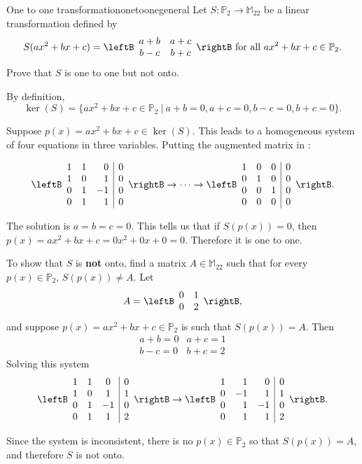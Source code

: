 \begin{example}{One to one transformation}{onetoonegeneral}
Let $S:\mathbb{P}_2\to\mathbb{M}_{22}$ be a linear transformation
defined by
\[ S(ax^2+bx+c)
=
\leftB\begin{array}{cc}
a+b & a+c \\ b-c & b+c \end{array}\rightB
\mbox{ for all }
 ax^2+bx+c\in \mathbb{P}_2.\]
Prove that $S$ is one to one but not onto.
\end{example}

\begin{solution}
By definition, 
\[ \ker(S)=\{ax^2+bx+c\in \mathbb{P}_2 ~|~ a+b=0,
a+c=0, b-c=0, b+c=0\}.\]

Suppose $p(x)=ax^2+bx+c\in\ker(S)$.
This leads to a homogeneous system of four equations in three 
variables.  
Putting the augmented matrix in {\rref}:

\[ \leftB\begin{array}{rrr|c}
1 & 1 & 0 & 0  \\
1 & 0 & 1 & 0  \\
0 & 1 & -1 & 0  \\
0 & 1 & 1 & 0  \end{array}\rightB
\rightarrow \cdots \rightarrow
\leftB\begin{array}{ccc|c}
1 & 0 & 0 & 0  \\
0 & 1 & 0 & 0  \\
0 & 0 & 1 & 0  \\
0 & 0 & 0 & 0  \end{array}\rightB. \]

The solution is $a=b=c=0$. This tells us that if $S(p(x)) = 0$, then $p(x) = ax^2+bx+c = 0x^2 + 0x + 0 = 0$. Therefore it is one to one. 

To show that $S$ is \textbf{not} onto, find a matrix $A\in\mathbb{M}_{22}$
such that for every $p(x)\in \mathbb{P}_2$, 
$S(p(x))\neq A$.
Let 
\[ A=\leftB\begin{array}{cc} 
0 & 1 \\ 0 & 2 \end{array}\rightB,\]
and suppose $p(x)=ax^2+bx+c\in \mathbb{P}_2$ is such that
$S(p(x))=A$.
Then
\[ \begin{array}{ll}
a+b=0 & a+c=1 \\ b-c=0 & b+c=2 \end{array}\]
Solving this system
\[ \leftB\begin{array}{ccc|c}
1 & 1 & 0 & 0  \\
1 & 0 & 1 & 1  \\
0 & 1 & -1 & 0  \\
0 & 1 & 1 & 2  \end{array}\rightB
\rightarrow 
\leftB\begin{array}{rrr|r}
1 & 1 & 0 & 0  \\
0 & -1 & 1 & 1  \\
0 & 1 & -1 & 0  \\
0 & 1 & 1 & 2  \end{array}\rightB. \]

Since the system is inconsistent, there is no $p(x)\in \mathbb{P}_2$ so
that $S(p(x))=A$, and therefore $S$ is not onto.
\end{solution}

